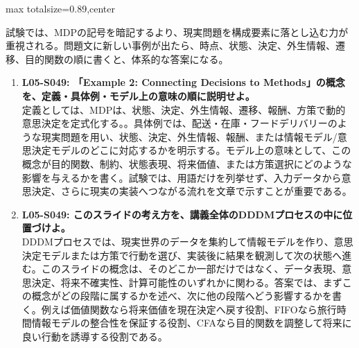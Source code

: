 \begin{minipage}[t]{0.58\textwidth}
\begin{adjustbox}{max totalsize={\textwidth}{0.89\textheight},center}
\begin{minipage}{\textwidth}
試験では、MDPの記号を暗記するより、現実問題を構成要素に落とし込む力が重視される。問題文に新しい事例が出たら、時点、状態、決定、外生情報、遷移、目的関数の順に書くと、体系的な答案になる。\par{}\begin{enumerate}\item \textbf{L05-S049: 「Example 2: Connecting Decisions to Methods」の概念を、定義・具体例・モデル上の意味の順に説明せよ。}\\定義としては、MDPは、状態、決定、外生情報、遷移、報酬、方策で動的意思決定を定式化する。。具体例では、配送・在庫・フードデリバリーのような現実問題を用い、状態、決定、外生情報、報酬、または情報モデル/意思決定モデルのどこに対応するかを明示する。モデル上の意味として、この概念が目的関数、制約、状態表現、将来価値、または方策選択にどのような影響を与えるかを書く。試験では、用語だけを列挙せず、入力データから意思決定、さらに現実の実装へつながる流れを文章で示すことが重要である。\item \textbf{L05-S049: このスライドの考え方を、講義全体のDDDMプロセスの中に位置づけよ。}\\DDDMプロセスでは、現実世界のデータを集約して情報モデルを作り、意思決定モデルまたは方策で行動を選び、実装後に結果を観測して次の状態へ進む。このスライドの概念は、そのどこか一部だけではなく、データ表現、意思決定、将来不確実性、計算可能性のいずれかに関わる。答案では、まずこの概念がどの段階に属するかを述べ、次に他の段階へどう影響するかを書く。例えば価値関数なら将来価値を現在決定へ戻す役割、FIFOなら旅行時間情報モデルの整合性を保証する役割、CFAなら目的関数を調整して将来に良い行動を誘導する役割である。\end{enumerate}
\end{minipage}
\end{adjustbox}
\end{minipage}


